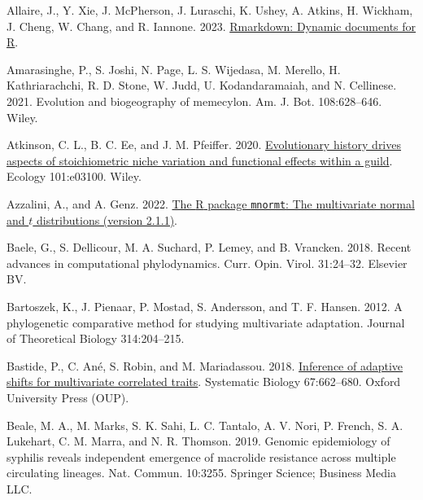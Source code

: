 \documentclass[fleqn,10pt,lineno]{wlpeerj} %
\newlength{\cslhangindent}
\newlength{\cslentryspacingunit} %
\newenvironment{CSLReferences}[2] %
 {%
  \setlength{\parindent}{0pt}
  \ifodd #1
  \let\oldpar\par
  \def\par{\hangindent=\cslhangindent\oldpar}
  \fi
  \setlength{\parskip}{#2\cslentryspacingunit}
 }%
 {}
\begin{document}
\hypertarget{refs}{}
\begin{CSLReferences}{1}{0}
\leavevmode{}%
Allaire, J., Y. Xie, J. McPherson, J. Luraschi, K. Ushey, A. Atkins, H. Wickham, J. Cheng, W. Chang, and R. Iannone. 2023. \href{https://github.com/rstudio/rmarkdown}{Rmarkdown: Dynamic documents for {R}}.

\leavevmode{}%
Amarasinghe, P., S. Joshi, N. Page, L. S. Wijedasa, M. Merello, H. Kathriarachchi, R. D. Stone, W. Judd, U. Kodandaramaiah, and N. Cellinese. 2021. Evolution and biogeography of memecylon. Am. J. Bot. 108:628--646. Wiley.

\leavevmode{}%
Atkinson, C. L., B. C. Ee, and J. M. Pfeiffer. 2020. \href{https://doi.org/10.1002/ecy.3100}{Evolutionary history drives aspects of stoichiometric niche variation and functional effects within a guild}. Ecology 101:e03100. Wiley.

\leavevmode{}%
Azzalini, A., and A. Genz. 2022. \href{http://azzalini.stat.unipd.it/SW/Pkg-mnormt/}{The {R} package \texttt{mnormt}: The multivariate normal and \(t\) distributions (version 2.1.1)}.

\leavevmode{}%
Baele, G., S. Dellicour, M. A. Suchard, P. Lemey, and B. Vrancken. 2018. Recent advances in computational phylodynamics. Curr. Opin. Virol. 31:24--32. Elsevier BV.

\leavevmode{}%
Bartoszek, K., J. Pienaar, P. Mostad, S. Andersson, and T. F. Hansen. 2012. A phylogenetic comparative method for studying multivariate adaptation. Journal of Theoretical Biology 314:204--215.

\leavevmode{}%
Bastide, P., C. Ané, S. Robin, and M. Mariadassou. 2018. \href{https://doi.org/10.1093/sysbio/syy005}{Inference of adaptive shifts for multivariate correlated traits}. Systematic Biology 67:662--680. Oxford University Press ({OUP}).

\leavevmode{}%
Beale, M. A., M. Marks, S. K. Sahi, L. C. Tantalo, A. V. Nori, P. French, S. A. Lukehart, C. M. Marra, and N. R. Thomson. 2019. Genomic epidemiology of syphilis reveals independent emergence of macrolide resistance across multiple circulating lineages. Nat. Commun. 10:3255. Springer Science; Business Media LLC.


\end{CSLReferences}
\end{document}
